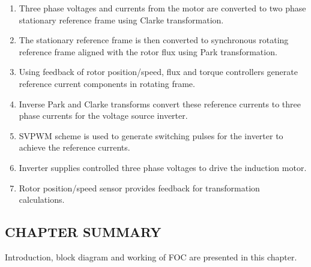 \begin{enumerate}
    
\item Three phase voltages and currents from the motor are converted to two phase stationary reference frame using Clarke transformation.

\item The stationary reference frame is then converted to synchronous rotating reference frame aligned with the rotor flux using Park transformation.

\item Using feedback of rotor position/speed, flux and torque controllers generate reference current components in rotating frame.

\item Inverse Park and Clarke transforms convert these reference currents to three phase currents for the voltage source inverter.

\item SVPWM scheme is used to generate switching pulses for the inverter to achieve the reference currents.

\item Inverter supplies controlled three phase voltages to drive the induction motor.

\item Rotor position/speed sensor provides feedback for transformation calculations.
\end{enumerate}

\subsection{CHAPTER SUMMARY}
\hspace{0.2in} Introduction, block diagram and working of FOC are presented in this chapter.

\newpage
